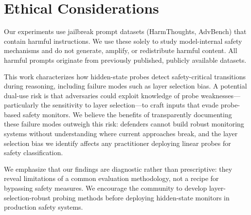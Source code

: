 \section*{Ethical Considerations}\label{sec:ethics}

Our experiments use jailbreak prompt datasets (HarmThoughts, AdvBench) that contain harmful instructions. We use these solely to study model-internal safety mechanisms and do not generate, amplify, or redistribute harmful content. All harmful prompts originate from previously published, publicly available datasets.

This work characterizes how hidden-state probes detect safety-critical transitions during reasoning, including failure modes such as layer selection bias. A potential dual-use risk is that adversaries could exploit knowledge of probe weaknesses---particularly the sensitivity to layer selection---to craft inputs that evade probe-based safety monitors. We believe the benefits of transparently documenting these failure modes outweigh this risk: defenders cannot build robust monitoring systems without understanding where current approaches break, and the layer selection bias we identify affects any practitioner deploying linear probes for safety classification.

We emphasize that our findings are diagnostic rather than prescriptive: they reveal limitations of a common evaluation methodology, not a recipe for bypassing safety measures. We encourage the community to develop layer-selection-robust probing methods before deploying hidden-state monitors in production safety systems.
